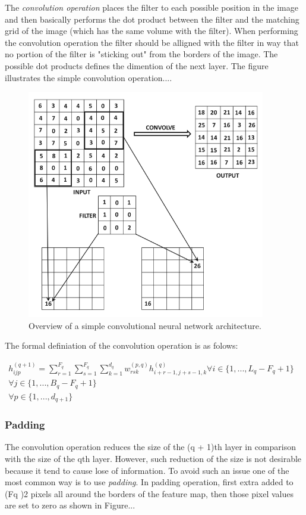 The \textit{convolution operation} places the filter to each possible position in the image and then basically performs the dot product between the filter and the matching grid of the image (which has the same volume with the filter). When performing the convolution operation the filter should be alligned with the filter in way that no portion of the filter is "sticking out" from the borders of the image. The possible dot products defines the dimention of the next layer. The figure illustrates the simple convolution  operation....
\begin{figure}[h]
\centering
 \includegraphics[height=10cm,width=\linewidth]{Figures/fig_cnn_convolution.png}
 \caption{Overview of a simple convolutional neural network architecture.}
 \label{fig:cnn_convolution}
\end{figure}

The formal definiation of the convolution operation is as folows:

\begin{equation}
\begin{split}
h_{ijp}^{(q+1)} = \sum_{r=1}^{F_q}\sum_{s=1}^{F_q}  \sum_{k=1}^{d_q} w_{rsk}^{(p,q)}h_{i+r-1,j+s-1,k}^{(q)} \forall i \in \{1,...,L_q-F_q +1\}& \\
\forall j \in \{1,...,B_q-F_q +1\}&\\
\forall p \in \{1,...,d_{q+1}\}&
\end{split}
\end{equation}


\subsubsection{Padding}
The convolution operation reduces the size of the (q + 1)th layer in comparison with the size of the qth layer. However, such reduction of the size is not desirable because it tend to cause lose of information.  To avoid such an issue one of the most common way is to use \textit{padding}. In padding operation, first extra added to (Fq )\/2 pixels all around the borders of the feature map, then those pixel values are set to zero as shown in Figure... 

